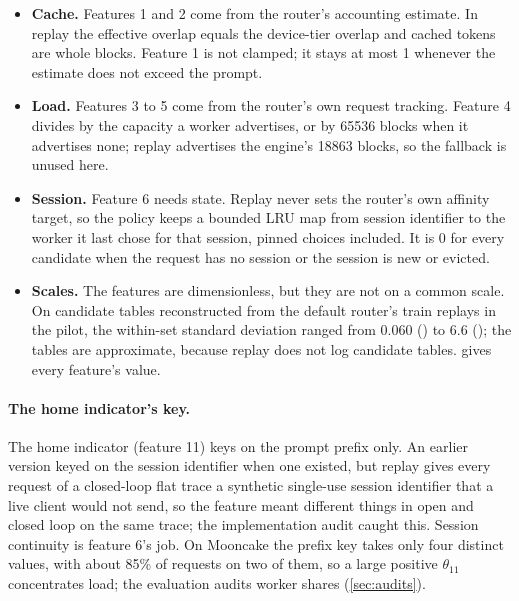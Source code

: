 \begin{itemize}
  \item \textbf{Cache.} Features 1 and 2 come from the router's accounting estimate. In replay
    the effective overlap equals the device-tier overlap and cached tokens are whole blocks.
    Feature 1 is not clamped; it stays at most 1 whenever the estimate does not exceed the prompt.
  \item \textbf{Load.} Features 3 to 5 come from the router's own request tracking. Feature 4
    divides by the capacity a worker advertises, or by \num{65536} blocks when it advertises none;
    replay advertises the engine's \num{18863} blocks, so the fallback is unused here.
  \item \textbf{Session.} Feature 6 needs state. Replay never sets the router's own affinity
    target, so the policy keeps a bounded LRU map from session identifier to the worker it last
    chose for that session, pinned choices included. It is 0 for every candidate when the request
    has no session or the session is new or evicted.
  \item \textbf{Scales.} The features are dimensionless, but they are not on a common scale. On
    candidate tables reconstructed from the default router's train replays in the pilot, the
    within-set standard deviation ranged from 0.060 () to 6.6
    (); the tables are approximate, because replay does not log
    candidate tables.  gives every feature's value.
\end{itemize}

\paragraph{The home indicator's key.}
The  home indicator (feature 11) keys on the prompt prefix only. An earlier version keyed
on the session identifier when one existed, but replay gives every request of a closed-loop flat
trace a synthetic single-use session identifier that a live client would not send, so the feature
meant different things in open and closed loop on the same trace; the implementation audit caught
this. Session continuity is feature 6's job. On Mooncake the prefix key takes only four distinct
values, with about 85\% of requests on two of them, so a large positive $\theta_{11}$
concentrates load; the evaluation audits worker shares (\cref{sec:audits}).

